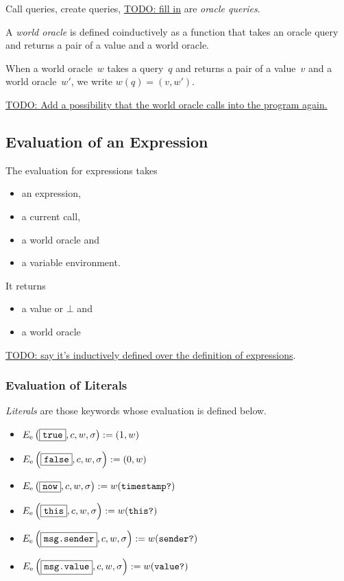 \documentclass{book}
\newcommand{\todo}[1]{\underline{TODO: {#1}}}
\newcommand{\evalE}[1]{E_\mathrm{e}\left({#1}\right)}
\begin{document}
Call queries, create queries, \todo{fill in} are \textit{oracle queries}.

A \textit{world oracle} is defined coinductively as a function that takes an oracle query and returns a pair of a value and a world oracle.

When a world oracle~$w$ takes a query~$q$ and returns a pair of a value~$v$ and a world oracle~$w'$, we write $w(q) = (v, w')$.

\todo{Add a possibility that the world oracle calls into the program again.}

\subsection{Evaluation of an Expression}

The evaluation for expressions takes
\begin{itemize}
\item an expression,
\item a current call,
\item a world oracle and
\item a variable environment.
\end{itemize}
It returns
\begin{itemize}
\item a value or $\bot$ and
\item a world oracle
\end{itemize}



\todo{say it's inductively defined over the definition of expressions}.

\subsubsection{Evaluation of Literals}

\textit{Literals} are those keywords whose evaluation is defined below.

\begin{itemize}
  \item $\evalE{\boxed{\true}, c, w, \sigma} := (1, w)$
  \item $\evalE{\boxed{\false}, c, w, \sigma} := (0, w)$
  \item $\evalE{\boxed{\now}, c, w, \sigma} := w(\timestampQuery)$
  \item $\evalE{\boxed{\this}, c, w, \sigma} := w(\thisQuery)$
  \item $\evalE{\boxed{\msgsender}, c, w, \sigma} := w(\senderQuery)$
  \item $\evalE{\boxed{\msgvalue}, c, w, \sigma} := w(\valueQuery)$
\end{itemize}
\end{document}
